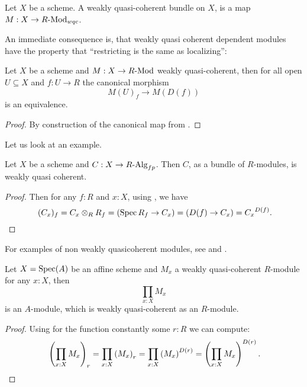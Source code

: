 \begin{definition}%
  \label{weakly-quasi-coherent-bundle}
  Let $X$ be a scheme.
  A weakly quasi-coherent bundle on $X$, is a map $M:X\to R\text{-}\mathrm{Mod}_{wqc}$.
\end{definition}

An immediate consequence is, that
weakly quasi coherent dependent modules have
the property that ``restricting is the same as localizing'':

\begin{lemma}
  \label{weakly-quasi-coherent-open-localization}
  Let $X$ be a scheme and $M:X\to R\text{-}\mathrm{Mod}$ weakly quasi-coherent,
  then for all open $U\subseteq X$ and $f:U\to R$
  the canonical morphism
  \[
    M(U)_f\to M(D(f))
  \]
  is an equivalence.
\end{lemma}

\begin{proof}
  By construction of the canonical map from .
\end{proof}

Let us look at an example.

\begin{proposition}%
  \label{fp-algebra-bundle-is-quasi-coherent}
  Let $X$ be a scheme and $C:X\to R\text{-}\mathrm{Alg}_{fp}$.
  Then $C$, as a bundle of $R$-modules, is weakly quasi coherent.
\end{proposition}

\begin{proof}
  Then for any $f:R$ and $x:X$, using , we have
  \[
    (C_x)_f=C_x\otimes_R R_f=(\Spec R_f \to C_x)=(D(f)\to C_x)={C_x}^{D(f)}
    \rlap{.}
  \]
\end{proof}

For examples of non weakly quasicoherent modules,
see 
and .

\begin{lemma}%
  \label{weakly-quasi-coherent-pi}
  Let $X=\operatorname{Spec}(A)$ be an affine scheme and $M_x$ a weakly quasi-coherent $R$-module for any $x:X$,
  then
  \[
    \prod_{x:X}M_x
  \]
  is an $A$-module, which is weakly quasi-coherent as an $R$-module.
\end{lemma}

\begin{proof}
  Using  for the function constantly some $r:R$
  we can compute:
  \[
    \left(\prod_{x:X}M_x\right)_r
    =\prod_{x:X}\left(M_x\right)_{r}
    =\prod_{x:X}\left(M_x\right)^{D(r)}
    =\left(\prod_{x:X}M_x\right)^{D(r)}
    \rlap{.}
  \]
\end{proof}


